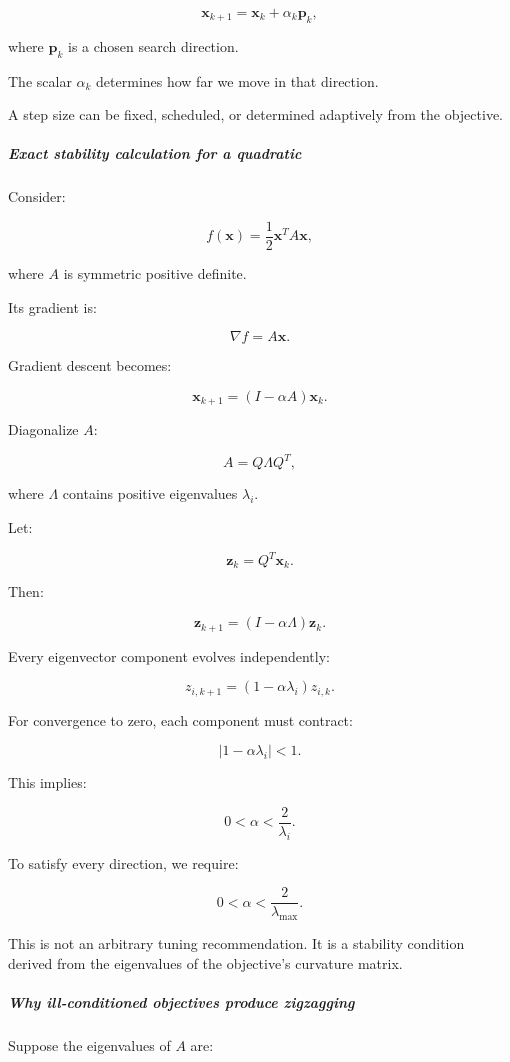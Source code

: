 \[
\mathbf x_{k+1}=\mathbf x_k+\alpha_k\mathbf p_k,
\]

where \(\mathbf p_k\) is a chosen search direction.

The scalar \(\alpha_k\) determines how far we move in that direction.

A step size can be fixed, scheduled, or determined adaptively from the objective.

\subparagraph{Exact stability calculation for a quadratic}\label{exact-stability-calculation-for-a-quadratic}

Consider:

\[
f(\mathbf x)=\frac12\mathbf x^TA\mathbf x,
\]

where \(A\) is symmetric positive definite.

Its gradient is:

\[
\nabla f=A\mathbf x.
\]

Gradient descent becomes:

\[
\mathbf x_{k+1} = (I-\alpha A)\mathbf x_k.
\]

Diagonalize \(A\):

\[
A=Q\Lambda Q^T,
\]

where \(\Lambda\) contains positive eigenvalues \(\lambda_i\).

Let:

\[
\mathbf z_k=Q^T\mathbf x_k.
\]

Then:

\[
\mathbf z_{k+1} = (I-\alpha\Lambda)\mathbf z_k.
\]

Every eigenvector component evolves independently:

\[
\boxed{ z_{i,k+1}=(1-\alpha\lambda_i)z_{i,k} }.
\]

For convergence to zero, each component must contract:

\[
|1-\alpha\lambda_i|<1.
\]

This implies:

\[
0<\alpha<\frac2{\lambda_i}.
\]

To satisfy every direction, we require:

\[
\boxed{ 0<\alpha<\frac2{\lambda_{\max}} }.
\]

This is not an arbitrary tuning recommendation. It is a stability condition derived from the eigenvalues of the objective's curvature matrix.

\subparagraph{Why ill-conditioned objectives produce zigzagging}\label{why-ill-conditioned-objectives-produce-zigzagging}

Suppose the eigenvalues of \(A\) are:

